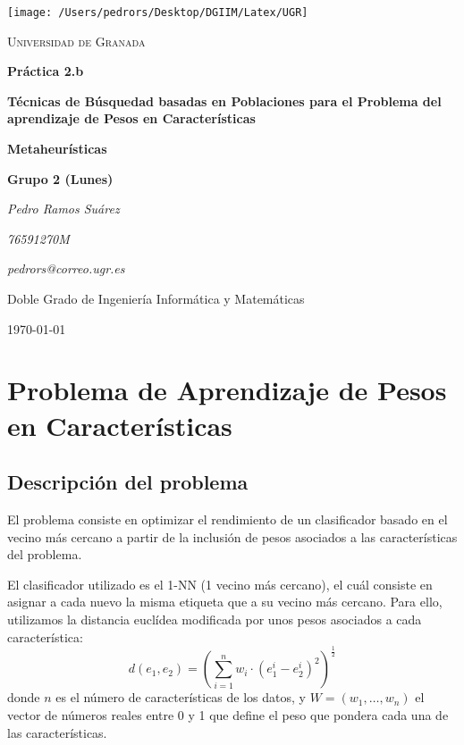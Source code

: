 \documentclass[11pt,a4paper]{article}
\begin{document}
\begin{titlepage}
\centering
\texttt{[image: /Users/pedrors/Desktop/DGIIM/Latex/UGR]}\par\vspace{1cm}
{\scshape\LARGE Universidad de Granada \par}
\vspace{1cm}
{\Huge\bfseries Práctica 2.b\par}
{\Large\bfseries Técnicas de Búsquedad basadas en Poblaciones para el Problema del aprendizaje de Pesos en Características\par}
\vspace{1.5cm}
{\huge\bfseries Metaheurísticas\par}
{\large\bfseries Grupo 2 (Lunes)\par}
\vspace{2cm}
{\Large\itshape Pedro Ramos Suárez\par}
{\large\itshape 76591270M\par}
{\large\itshape pedrors@correo.ugr.es\par}
\vfill
Doble Grado de Ingeniería Informática y Matemáticas
\vfill
{\large \today \par}
\author{A}
\end{titlepage}

\tableofcontents
\newpage
\section{Problema de Aprendizaje de Pesos en Características}

\subsection{Descripción del problema}

El problema consiste en optimizar el rendimiento de un clasificador basado en el vecino más cercano a partir de la inclusión de pesos asociados a las características del problema.

El clasificador utilizado es el 1-NN (1 vecino más cercano), el cuál consiste en asignar a cada nuevo la misma etiqueta que a su vecino más cercano. Para ello, utilizamos la distancia euclídea modificada por unos pesos asociados a cada característica:
$$d(e_{1}, e_{2}) = (\sum_{i=1}^{n} w_{i} \cdot (e_{1}^{i} - e_{2}^{i})^{2})^{\frac{1}{2}}$$
donde $n$ es el número de características de los datos, y $W = (w_{1}, \dots, w_{n})$ el vector de números reales entre 0 y 1 que define el peso que pondera cada una de las características.
\end{document}
